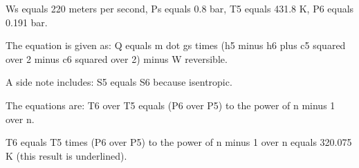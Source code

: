 Ws equals 220 meters per second, Ps equals 0.8 bar, T5 equals 431.8 K, P6 equals 0.191 bar.

The equation is given as:
Q equals m dot gs times (h5 minus h6 plus c5 squared over 2 minus c6 squared over 2) minus W reversible.

A side note includes:
S5 equals S6 because isentropic.

The equations are:
T6 over T5 equals (P6 over P5) to the power of n minus 1 over n.

T6 equals T5 times (P6 over P5) to the power of n minus 1 over n equals 320.075 K (this result is underlined).